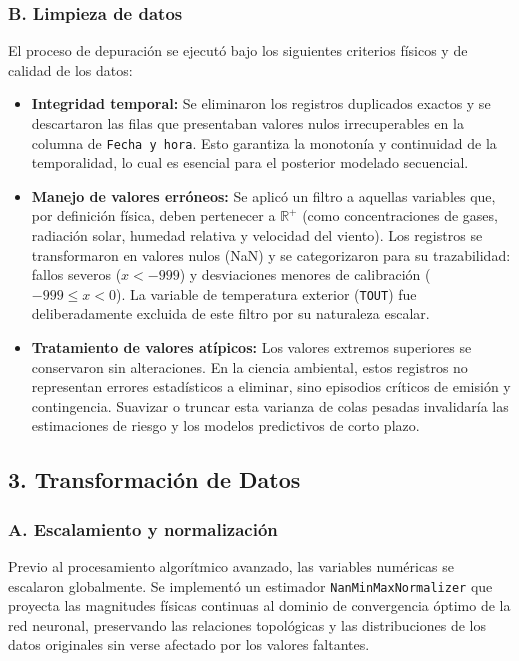 \documentclass[11pt]{article}
\begin{document}
\subsubsection*{B. Limpieza de datos}

El proceso de depuración se ejecutó bajo los siguientes criterios físicos y de calidad de los datos: 
\begin{itemize}
    \item \textbf{Integridad temporal:} Se eliminaron los registros duplicados exactos y se descartaron las filas que presentaban valores nulos irrecuperables en la columna de \texttt{Fecha y hora}. Esto garantiza la monotonía y continuidad de la temporalidad, lo cual es esencial para el posterior modelado secuencial. 
    \item \textbf{Manejo de valores erróneos:} Se aplicó un filtro a aquellas variables que, por definición física, deben pertenecer a $\mathbb{R}^{+}$ (como concentraciones de gases, radiación solar, humedad relativa y velocidad del viento). Los registros se transformaron en valores nulos (NaN) y se categorizaron para su trazabilidad: fallos severos ($x < -999$) y desviaciones menores de calibración ($-999 \le x < 0$). La variable de temperatura exterior (\texttt{TOUT}) fue deliberadamente excluida de este filtro por su naturaleza escalar.
    \item \textbf{Tratamiento de valores atípicos:} Los valores extremos superiores se conservaron sin alteraciones. En la ciencia ambiental, estos registros no representan errores estadísticos a eliminar, sino episodios críticos de emisión y contingencia. Suavizar o truncar esta varianza de colas pesadas invalidaría las estimaciones de riesgo y los modelos predictivos de corto plazo.
\end{itemize}

\subsection*{3. Transformación de Datos}

\subsubsection*{A. Escalamiento y normalización}
Previo al procesamiento algorítmico avanzado, las variables numéricas se escalaron globalmente. Se implementó un estimador \texttt{NanMinMaxNormalizer} que proyecta las magnitudes físicas continuas al dominio de convergencia óptimo de la red neuronal, preservando las relaciones topológicas y las distribuciones de los datos originales sin verse afectado por los valores faltantes.
\end{document}
